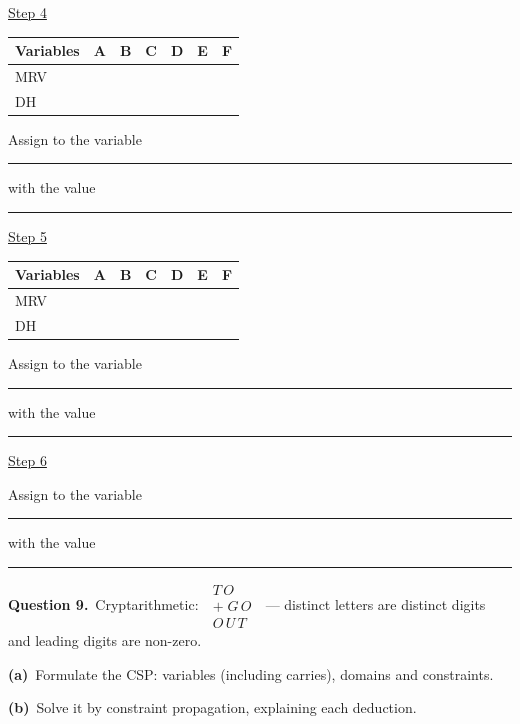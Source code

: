 \documentclass[11pt,a4paper]{article}
\newcommand{\question}[1]{\par\medskip\noindent\textbf{Question #1.}\ }
\newcommand{\subq}[1]{\par\smallskip\noindent\textbf{#1}\ }
\begin{document}
\underline{Step 4}\par\begin{center}\small \begin{tabular}{|l|c|c|c|c|c|c|}\hline Variables & \textbf{A} & \textbf{B} & \textbf{C} & \textbf{D} & \textbf{E} & \textbf{F}\\ \hline MRV & \phantom{0} & \phantom{0} & \phantom{0} & \phantom{0} & \phantom{0} & \phantom{0}\\[1mm]\hline DH & \phantom{0} & \phantom{0} & \phantom{0} & \phantom{0} & \phantom{0} & \phantom{0}\\[1mm]\hline\end{tabular}\end{center}Assign to the variable \rule{2.5cm}{0.3pt} with the value \rule{2.5cm}{0.3pt}\par
\underline{Step 5}\par\begin{center}\small \begin{tabular}{|l|c|c|c|c|c|c|}\hline Variables & \textbf{A} & \textbf{B} & \textbf{C} & \textbf{D} & \textbf{E} & \textbf{F}\\ \hline MRV & \phantom{0} & \phantom{0} & \phantom{0} & \phantom{0} & \phantom{0} & \phantom{0}\\[1mm]\hline DH & \phantom{0} & \phantom{0} & \phantom{0} & \phantom{0} & \phantom{0} & \phantom{0}\\[1mm]\hline\end{tabular}\end{center}Assign to the variable \rule{2.5cm}{0.3pt} with the value \rule{2.5cm}{0.3pt}\par
\underline{Step 6}\par Assign to the variable \rule{2.5cm}{0.3pt} with the value \rule{2.5cm}{0.3pt}\par
\clearpage
\question{9}Cryptarithmetic: $\;\begin{array}{r} T\,O\\ +\;G\,O\\ \hline O\,U\,T\end{array}\;$ --- distinct letters are distinct digits and leading digits are non-zero.
\subq{(a)}Formulate the CSP: variables (including carries), domains and constraints.
\begin{ansbox}[height=2.0cm]\end{ansbox}
\subq{(b)}Solve it by constraint propagation, explaining each deduction.
\begin{ansbox}[height=2.4cm]\end{ansbox}
\end{document}
